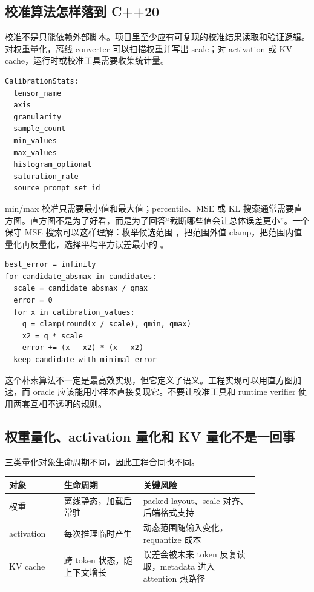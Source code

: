 \subsection{校准算法怎样落到 C++20}

校准不是只能依赖外部脚本。项目里至少应有可复现的校准结果读取和验证逻辑。对权重量化，离线 converter 可以扫描权重并写出 scale；对 activation 或 KV cache，运行时或校准工具需要收集统计量。

\begin{lstlisting}[numbers=none,caption={校准统计的最小结构}]
CalibrationStats:
  tensor_name
  axis
  granularity
  sample_count
  min_values
  max_values
  histogram_optional
  saturation_rate
  source_prompt_set_id
\end{lstlisting}

min/max 校准只需要最小值和最大值；percentile、MSE 或 KL 搜索通常需要直方图。直方图不是为了好看，而是为了回答“截断哪些值会让总体误差更小”。一个保守 MSE 搜索可以这样理解：枚举候选范围 \code{[-a,a]}，把范围外值 clamp，把范围内值量化再反量化，选择平均平方误差最小的 。

\begin{lstlisting}[numbers=none,caption={MSE calibration 的朴素形态}]
best_error = infinity
for candidate_absmax in candidates:
  scale = candidate_absmax / qmax
  error = 0
  for x in calibration_values:
    q = clamp(round(x / scale), qmin, qmax)
    x2 = q * scale
    error += (x - x2) * (x - x2)
  keep candidate with minimal error
\end{lstlisting}

这个朴素算法不一定是最高效实现，但它定义了语义。工程实现可以用直方图加速，而 oracle 应该能用小样本直接复现它。不要让校准工具和 runtime verifier 使用两套互相不透明的规则。

\subsection{权重量化、activation 量化和 KV 量化不是一回事}

三类量化对象生命周期不同，因此工程合同也不同。

\begin{center}
\begin{tabular}{p{0.18\linewidth}p{0.26\linewidth}p{0.38\linewidth}}
\toprule
对象 & 生命周期 & 关键风险 \\
\midrule
权重 & 离线静态，加载后常驻 & packed layout、scale 对齐、后端格式支持 \\
activation & 每次推理临时产生 & 动态范围随输入变化，requantize 成本 \\
KV cache & 跨 token 状态，随上下文增长 & 误差会被未来 token 反复读取，metadata 进入 attention 热路径 \\
\bottomrule
\end{tabular}
\end{center}

